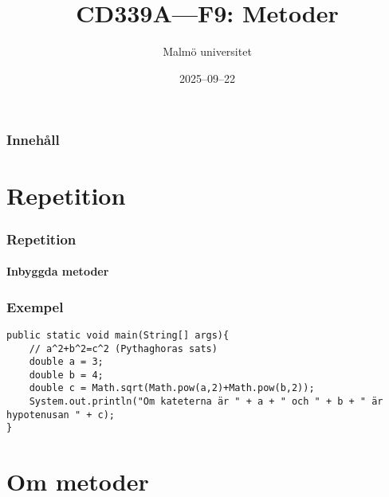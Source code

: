 \documentclass[aspectratio=169]{beamer}
\title{CD339A---F9: Metoder}
\author{Malmö universitet}
\date{2025--09--22}
\institute{Institutionen för datavetenskap och medieteknik}
\begin{document}
\begin{frame}
    \frametitle{Innehåll}


\end{frame}

\section{Repetition}

\begin{frame}
    \frametitle{Repetition}
    \framesubtitle{Inbyggda metoder}



\end{frame}

\begin{frame}[fragile]
    \frametitle{Exempel}


    \begin{lstlisting}
public static void main(String[] args){
    // a^2+b^2=c^2 (Pythaghoras sats)
    double a = 3;
    double b = 4;
    double c = Math.sqrt(Math.pow(a,2)+Math.pow(b,2));
    System.out.println("Om kateterna är " + a + " och " + b + " är hypotenusan " + c);
}   \end{lstlisting}


\end{frame}

\section{Om metoder}
\end{document}
